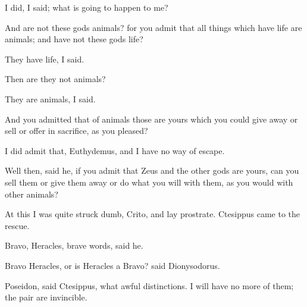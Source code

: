\documentclass[11pt,letter]{article}
\begin{document}
\par  I did, I said; what is going to happen to me?

\par  And are not these gods animals? for you admit that all things which have life are animals; and have not these gods life?

\par  They have life, I said.

\par  Then are they not animals?

\par  They are animals, I said.

\par  And you admitted that of animals those are yours which you could give away or sell or offer in sacrifice, as you pleased?

\par  I did admit that, Euthydemus, and I have no way of escape.

\par  Well then, said he, if you admit that Zeus and the other gods are yours, can you sell them or give them away or do what you will with them, as you would with other animals?

\par  At this I was quite struck dumb, Crito, and lay prostrate. Ctesippus came to the rescue.

\par  Bravo, Heracles, brave words, said he.

\par  Bravo Heracles, or is Heracles a Bravo? said Dionysodorus.

\par  Poseidon, said Ctesippus, what awful distinctions. I will have no more of them; the pair are invincible.
\end{document}
